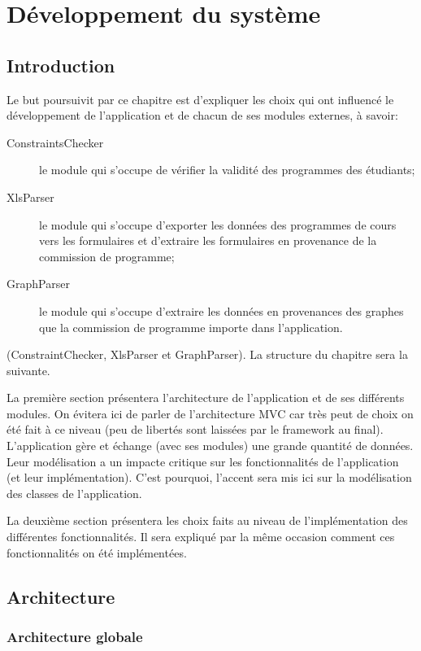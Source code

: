 \chapter{Développement du système}
\section{Introduction}
Le but poursuivit par ce chapitre est d'expliquer les choix qui ont influencé le développement de l'application et de chacun de ses modules externes, à savoir:

\begin{description}
  \item[ConstraintsChecker] le module qui s'occupe de vérifier la validité des programmes des étudiants;
  \item[XlsParser] le module qui s'occupe d'exporter les données des programmes de cours vers les formulaires et d'extraire les formulaires en provenance de la commission de programme;
  \item[GraphParser] le module qui s'occupe d'extraire les données en provenances des graphes que la commission de programme importe dans l'application.
\end{description}(ConstraintChecker, XlsParser et GraphParser). La structure du chapitre sera la suivante. 

La première section présentera l'architecture de l'application et de ses différents modules. On évitera ici de parler de l'architecture MVC car très peut de choix on été fait à ce niveau  (peu de libertés sont laissées par le framework au final). L'application gère et échange (avec ses modules) une grande quantité de données. Leur modélisation a un impacte critique sur les fonctionnalités de l'application (et leur implémentation). C'est pourquoi, l'accent sera mis ici sur la modélisation des classes de l'application.   

La deuxième section présentera les choix faits au niveau de l'implémentation des différentes fonctionnalités. Il sera expliqué par la même occasion comment ces fonctionnalités on été implémentées. 


\label{developpement_system}
\section{Architecture}

\subsection{Architecture globale}

